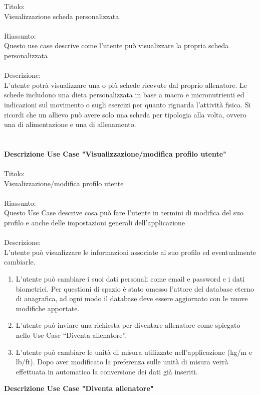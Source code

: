 \documentclass{article}
\begin{document}
Titolo:\\
Visualizzazione scheda personalizzata\\
\\
Riassunto:\\
Questo use case descrive come l’utente può visualizzare la propria scheda personalizzata\\
\\
Descrizione:\\
L’utente potrà visualizzare una o più schede ricevute dal proprio allenatore. Le schede includono una dieta personalizzata in base a macro e
micronutrienti ed indicazioni sul movimento o sugli esercizi per quanto riguarda l’attività fisica. Si ricordi che un allievo può avere solo una
scheda per tipologia alla volta, ovvero una di alimentazione e una di allenamento.\\
\\
\\
\textbf{Descrizione Use Case "Visualizzazione/modifica profilo utente"}\\
\\
Titolo:\\
Visualizzazione/modifica profilo utente\\
\\
Riassunto:\\
Questo Use Case descrive cosa può fare l’utente in termini di modifica del suo profilo e anche delle impostazioni generali dell’applicazione\\
\\
Descrizione:\\ 
L’utente può visualizzare le informazioni associate al suo profilo ed eventualmente cambiarle.
\begin{enumerate}
    \item L’utente può cambiare i suoi dati personali come email e password e i dati biometrici. Per questioni di spazio è stato omesso l’attore
            del database eterno di anagrafica, ad ogni modo il database deve essere aggiornato con le nuove modifiche apportate.
    \item L’utente può inviare una richiesta per diventare allenatore come spiegato nello Use Case “Diventa allenatore”.
    \item L’utente può cambiare le unità di misura utilizzate nell’applicazione (kg/m e lb/ft).  Dopo aver modificato la preferenza sulle unità di
            misura verrà effettuata in automatico la conversione dei dati già inseriti.
\end{enumerate}
\bigskip
\textbf{Descrizione Use Case "Diventa allenatore"}\\
\end{document}
